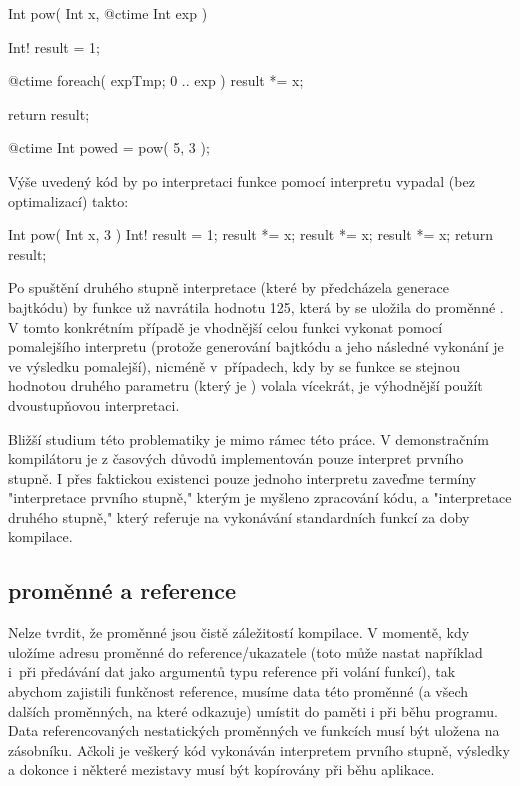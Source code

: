 \begin{code}
Int pow( Int x, @ctime Int exp ) {
	Int! result = 1;
	
	@ctime foreach( expTmp; 0 .. exp )
		result *= x;
		
	return result;
}

@ctime Int powed = pow( 5, 3 );
\end{code}

Výše uvedený kód by po interpretaci funkce  pomocí \ctime interpretu vypadal (bez optimalizací) takto:

\begin{code}
Int pow( Int x, 3 ) {
	Int! result = 1;
	result *= x;
	result *= x;
	result *= x;
	return result;
}
\end{code}

Po spuštění druhého stupně interpretace (které by předcházela generace bajtkódu) by funkce už navrátila hodnotu 125, která by se uložila do proměnné . V tomto konkrétním případě je vhodnější celou funkci vykonat pomocí pomalejšího \ctime interpretu (protože generování bajtkódu a jeho následné vykonání je ve výsledku pomalejší), nicméně v~případech, kdy by se funkce  se stejnou hodnotou druhého parametru (který je \ctime) volala vícekrát, je výhodnější použít dvoustupňovou interpretaci.

Bližší studium této problematiky je mimo rámec této práce. V demonstračním kompilátoru je z časových důvodů implementován pouze interpret prvního stupně. I přes faktickou existenci pouze jednoho interpretu zaveďme termíny "interpretace prvního stupně," kterým je myšleno zpracování \ctime kódu, a "interpretace druhého stupně," který referuje na vykonávání standardních funkcí za doby kompilace.

\subsection{\ctime proměnné a \nonctime reference}
Nelze tvrdit, že \ctime proměnné jsou čistě záležitostí kompilace. V momentě, kdy uložíme adresu \ctime proměnné do \nonctime reference/ukazatele (toto může nastat například i~při předávání \ctime dat jako argumentů typu reference při volání \nonctime funkcí), tak abychom zajistili funkčnost reference, musíme data této proměnné (a všech dalších proměnných, na které odkazuje) umístit do paměti i při běhu programu. Data referencovaných nestatických \ctime proměnných ve funkcích musí být uložena na zásobníku. Ačkoli je veškerý \ctime kód vykonáván interpretem prvního stupně, výsledky a dokonce i některé mezistavy musí být kopírovány při běhu aplikace.

